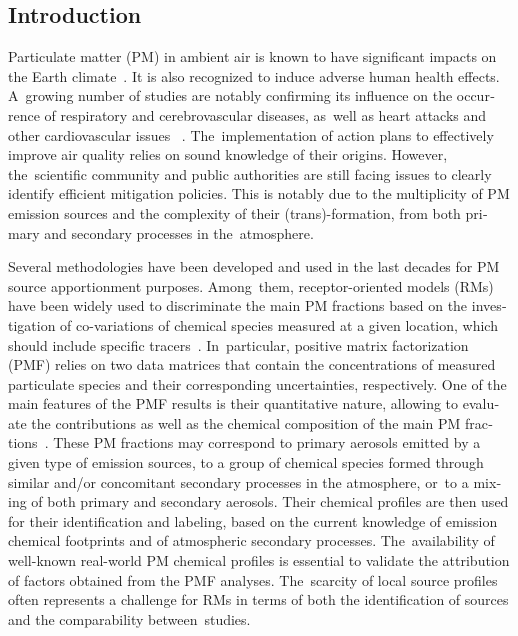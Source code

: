 
\begin{otherlanguage}{english}
\section{Introduction} 

Particulate matter (PM) in ambient air is known to have significant impacts on the Earth
climate~\autocite{stockerClimate2013}. It is also recognized to induce adverse human
health effects. A~growing number of studies are notably confirming its influence on the
occurrence of respiratory and cerebrovascular diseases, as~well as heart attacks and other
cardiovascular issues ~\autocite{kellyLinking2015,lippmanNational2013}. The~implementation
of action plans to effectively improve air quality relies on sound knowledge of their
origins. However, the~scientific community and public authorities are still facing issues
to clearly identify efficient mitigation policies. This is notably due to the multiplicity
of PM emission sources and the complexity of their (trans)-formation,   from both primary
and secondary processes in the~atmosphere. 

Several methodologies have been developed and used in the last decades for PM source
apportionment purposes. Among~them, receptor-oriented models (RMs) have been widely used
to discriminate the main PM fractions based on the investigation of co-variations of
chemical species measured at a given location, which  should include specific
tracers~\autocite{srivastavaSpeciation2018,karagulianContributions2015,belisCritical2013,vianaSource2008}.
In~particular, positive matrix factorization (PMF) relies on two data matrices that
contain the concentrations of measured particulate species and their corresponding
uncertainties, respectively. One of the main features of the PMF results is their
quantitative nature, allowing to evaluate the contributions as well as the chemical
composition of the main PM fractions~\autocite{paateroLeast1997, paateroPositive1994}.
These PM fractions may correspond to primary aerosols emitted by a given type of emission
sources, to a group of chemical species formed through similar and/or concomitant
secondary processes in the atmosphere, or~to a mixing of both primary and secondary
aerosols. Their chemical profiles are then used for their identification and labeling,
based on the current knowledge of emission chemical footprints and of atmospheric
secondary processes. The~availability of well-known real-world PM chemical profiles is
essential to validate the attribution of factors obtained from the PMF analyses.
The~scarcity of local source profiles often represents a challenge for RMs in terms of
both the identification of sources and the comparability between~studies.


\end{otherlanguage}
